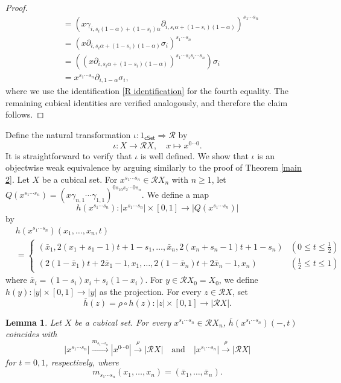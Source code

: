 \documentclass[oneside, 12pt]{amsart}
\numberwithin{equation}{section}
\theoremstyle{plain}
\newtheorem{lemma}[theorem]{Lemma}
\theoremstyle{definition}
\theoremstyle{remark}
\newcommand{\cSet}{\mathsf{cSet}}
\begin{document}
\begin{proof}
\begin{align*}
			&=(x\gamma_{i,s_i(1-\alpha)+(1-s_i)\alpha}\partial_{i,s_i\alpha+(1-s_i)(1-\alpha)})^{s_1\cdots s_n}\\
			&=(x\partial_{i,s_i\alpha+(1-s_i)(1-\alpha)}\sigma_i)^{s_1\cdots s_n}\\
			&=((x\partial_{i,s_i\alpha+(1-s_i)(1-\alpha)})^{s_1\cdots s_is_i\cdots s_n})\sigma_i\\
			&=x^{s_1\cdots s_n}\partial_{i,1-\alpha}\sigma_i,
		\end{align*}
		where we use the identification \eqref{R identification} for the fourth equality. The remaining cubical identities are verified analogously, and therefore the claim follows.
	\end{proof}
	
	
	
	Define the natural transformation $\iota\colon 1_{\cSet}\Rightarrow\mathcal{R}$ by
	\[
	\iota\colon X\to\mathcal{R}X,\quad x\mapsto x^{0\cdots 0}.
	\]
	It is straightforward to verify that $\iota$ is well defined. We show that $\iota$ is an objectwise weak equivalence by arguing similarly to the proof of Theorem \ref{main 2}. Let $X$ be a cubical set. For $x^{s_1\cdots s_n}\in\mathcal{R}X_n$ with $n\ge 1$, let $Q(x^{s_1\cdots s_n})=(x\gamma_{n,1}\cdots\gamma_{1,1})^{0s_10s_2\cdots0s_n}$. We define a map
	\[
	h(x^{s_1\cdots s_n})\colon|x^{s_1\cdots s_n}|\times[0,1]\to|Q(x^{s_1\cdots s_n})|
	\]
	by
	\begin{align*}
		&h(x^{s_1\cdots s_n})(x_1,\ldots,x_n,t)\\
		&=
		\begin{cases}
			(\bar{x}_1,2(x_1+s_1-1)t+1-s_1,\ldots,\bar{x}_n,2(x_n+s_n-1)t+1-s_n)&(0\le t\le\frac{1}{2})\\
			(2(1-\bar{x}_1)t+2\bar{x}_1-1,x_1,\ldots,2(1-\bar{x}_n)t+2\bar{x}_n-1,x_n)&(\frac{1}{2}\le t\le 1)
		\end{cases}
	\end{align*}
	where $\bar{x}_i=(1-s_i)x_i+s_i(1-x_i)$. For $y\in \mathcal{R}X_0=X_0$, we define $h(y)\colon|y|\times[0,1]\to|y|$ as the projection. For every $z\in\mathcal{R}X$, set
	\[
	\bar{h}(z)=\rho\circ h(z)\colon|z|\times[0,1]\to|\mathcal{R}X|.
	\]
	
	
	
	\begin{lemma}
		\label{R t=0,1}
		Let $X$ be a cubical set. For every $x^{s_1\cdots s_n}\in\mathcal{R}X_n$, $\bar{h}(x^{s_1\cdots s_n})(-,t)$ coincides with
		\[
		|x^{s_1\cdots s_n}|\xrightarrow{m_{s_1\cdots s_n}}|x^{0\cdots 0}|\xrightarrow{\rho}|\mathcal{R}X|\quad\text{and}\quad|x^{s_1\cdots s_n}|\xrightarrow{\rho}|\mathcal{R}X|
		\]
		for $t=0,1$, respectively, where
		\[
		m_{s_1\cdots s_n}(x_1,\ldots,x_n)=(\bar{x}_1,\ldots,\bar{x}_n).
		\]
	\end{lemma}
	
\end{document}
